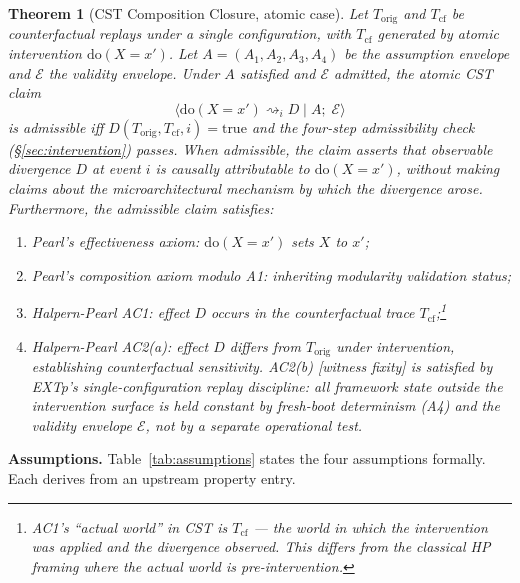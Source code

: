 \documentclass[conference]{IEEEtran}
\newtheorem{theorem}{Theorem}
\newcommand{\Korig}{T_\text{orig}}
\newcommand{\Tcf}{T_\text{cf}}
\newcommand{\dox}[1]{\text{do}(X{=}#1)}
\begin{document}
\begin{theorem}[CST Composition Closure, atomic case]
\label{thm:cst}
Let $\Korig$ and $\Tcf$ be counterfactual replays under a single
configuration, with $\Tcf$ generated by atomic intervention
$\dox{x'}$. Let $A = (A_1, A_2, A_3, A_4)$ be the assumption envelope
and $\mathcal{E}$ the validity envelope. Under $A$ satisfied and
$\mathcal{E}$ admitted, the atomic CST claim
$$\big\langle \dox{x'} \rightsquigarrow_i D \;\big|\;
A;\;\mathcal{E} \big\rangle$$
is \emph{admissible} iff $D(\Korig, \Tcf, i) = \text{true}$ and the
four-step admissibility check (\S\ref{sec:intervention}) passes.
When admissible, the claim asserts that observable divergence $D$ at
event $i$ is causally attributable to $\dox{x'}$, without making
claims about the microarchitectural mechanism by which the
divergence arose. Furthermore, the admissible claim satisfies:
\begin{enumerate}[label=(\roman*)]
\item Pearl's effectiveness axiom: $\dox{x'}$ sets $X$ to $x'$;
\item Pearl's composition axiom modulo A1: inheriting modularity
  validation status;
\item Halpern-Pearl AC1: effect $D$ occurs in the counterfactual
  trace $\Tcf$;\footnote{AC1's ``actual world'' in CST is $\Tcf$ ---
  the world in which the intervention was applied and the divergence
  observed. This differs from the classical HP framing where the
  actual world is pre-intervention.}
\item Halpern-Pearl AC2(a): effect $D$ differs from $\Korig$ under
  intervention, establishing counterfactual sensitivity. AC2(b)
  [witness fixity] is satisfied by EXTp's single-configuration
  replay discipline: all framework state outside the intervention
  surface is held constant by fresh-boot determinism (A4) and the
  validity envelope $\mathcal{E}$, not by a separate operational
  test.
\end{enumerate}
\end{theorem}

\textbf{Assumptions.} Table~\ref{tab:assumptions} states the four
assumptions formally. Each derives from an upstream property entry.
\end{document}

